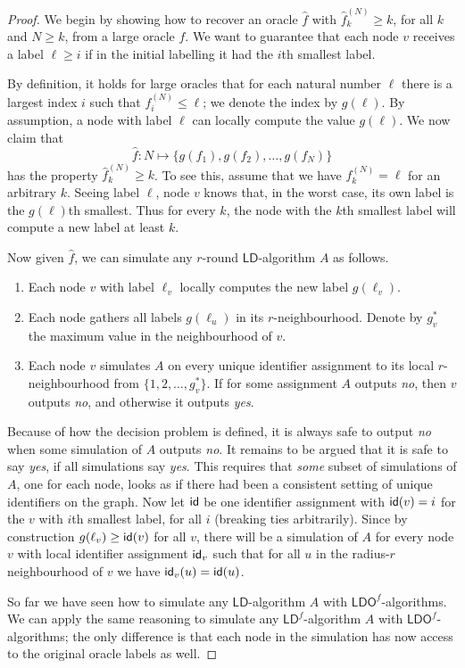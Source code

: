 \documentclass[11pt,a4paper]{article}
\theoremstyle{definition}
\theoremstyle{remark}
\newcommand{\ldo}{\mathsf{LDO}}
\newcommand{\ld}{\mathsf{LD}}
\newcommand{\id}{\text{\sf id}}
\begin{document}
\lemstrongldofldf*

\begin{proof}
We begin by showing how to recover an oracle $\hat{f}$ with $\hat{f}_k^{(N)} \ge k$, for all $k$ and $N \ge k$, from a large oracle $f$. We want to guarantee that each node $v$ receives a label $\ell \ge i$ if in the initial labelling it had the $i$th smallest label.

By definition, it holds for large oracles that for each natural number $\ell$ there is a largest index $i$ such that $f^{(N)}_i \le \ell$; we denote the index by $g(\ell)$. By assumption, a node with label $\ell$ can locally compute the value $g(\ell)$. We now claim that 
\[
    \hat{f}\colon N \mapsto \bigl\{ g(f_1), g(f_2), \dots, g(f_N) \bigr\}
\]
has the property $\hat{f}_k^{(N)} \ge k$. To see this, assume that we have $f^{(N)}_k = \ell$ for an arbitrary $k$. Seeing label $\ell$, node $v$ knows that, in the worst case, its own label is the $g(\ell)$th smallest. Thus for every $k$, the node with the $k$th smallest label will compute a new label at least $k$.

Now given $\hat{f}$, we can simulate any $r$-round $\ld$-algorithm $A$ as follows.
\begin{enumerate}
    \item Each node $v$ with label $\ell_v$ locally computes the new label $g(\ell_v)$.
    \item Each node gathers all labels $g(\ell_u)$ in its $r$-neighbourhood. Denote by $g_v^*$ the maximum value in the neighbourhood of $v$.
    \item Each node $v$ simulates $A$ on every unique identifier assignment to its local $r$-neighbourhood from $\{1,2,\dotsc,g_v^*\}$. If for some assignment $A$ outputs \emph{no}, then $v$ outputs \emph{no}, and otherwise it outputs \emph{yes}. 
\end{enumerate}
Because of how the decision problem is defined, it is always safe to output \emph{no} when some simulation of $A$ outputs \emph{no}. It remains to be argued that it is safe to say \emph{yes}, if all simulations say \emph{yes}. This requires that \emph{some} subset of simulations of $A$, one for each node, looks as if there had been a consistent setting of unique identifiers on the graph. Now let $\id$ be one identifier assignment with $\id(v) = i$ for the $v$ with $i$th smallest label, for all $i$ (breaking ties arbitrarily). Since by construction $g(\ell_v) \ge \id(v)$ for all $v$, there will be  a simulation of $A$ for every node $v$ with local identifier assignment $\id_v$ such that for all $u$ in the radius-$r$ neighbourhood of $v$ we have $\id_v(u) = \id(u)$.

So far we have seen how to simulate any $\ld$-algorithm $A$ with $\ldo^f$-algorithms. We can apply the same reasoning to simulate any $\ld^f$-algorithm $A$ with $\ldo^f$-algorithms; the only difference is that each node in the simulation has now access to the original oracle labels as well. \qedhere
\end{proof}
\end{document}
